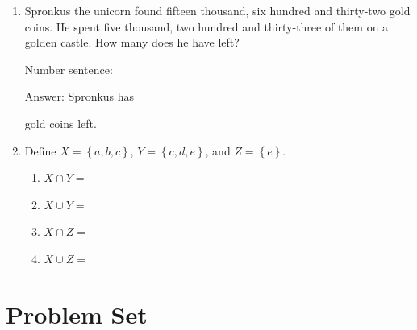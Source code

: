 \documentclass{tufte-book}
\begin{document}
\begin{enumerate}
  \item Spronkus the unicorn found fifteen thousand, six hundred and thirty-two gold coins.
  He spent five thousand, two hundred and thirty-three of them on a golden castle. How many does he have left?\bigskip\par
  Number sentence: \dotfill\bigskip\par
  Answer: Spronkus has \dotfill\bigskip\par\dotfill\bigskip\par\dotfill\bigskip gold coins left.

  \item Define $X = \left\{a, b, c\right\}$, $Y = \left\{c, d, e\right\}$, and $Z = \left\{e\right\}$.
  \begin{enumerate}
    \item $X \cap Y = $\dotfill\bigskip
    \item $X \cup Y = $\dotfill\bigskip
    \item $X \cap Z = $\dotfill\bigskip
    \item $X \cup Z = $\dotfill\bigskip
  \end{enumerate}
\end{enumerate}

\clearpage\section{Problem Set }
\end{document}

